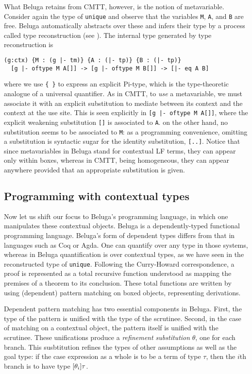 What Beluga retains from CMTT, however, is the notion of metavariable.
Consider again the type of \lstinline!unique! and observe that the variables
\lstinline!M!, \lstinline!A!, and \lstinline!B! are free.
Beluga automatically abstracts over these and infers their type by a process
called type reconstruction (see \cite{abstraction}).
The internal type generated by type reconstruction is
\begin{lstlisting}[gobble=2]
  (g:ctx) {M : (g |- tm)} {A : (|- tp)} {B : (|- tp)}
  [g |- oftype M A[]] -> [g |- oftype M B[]] -> [|- eq A B]
\end{lstlisting}
where we use \lstinline!{ }! to express an explicit Pi-type,
which is the type-theoretic analogue of a universal quantifier.
As in CMTT, to \emph{use} a metavariable, we must associate it with an explicit
substitution to mediate between its context and the context at the use site.
This is seen explicitly in \lstinline![g |- oftype M A[]]!, where the explicit
weakening substitution \lstinline![]! is associated to \lstinline!A!.
on the other hand, no substitution seems to be associated to \lstinline!M!:
as a programming convenience, omitting a substitution is syntactic sugar for the
identity substitution, \lstinline![..]!.
Notice that since metavariables in Beluga stand for contextual LF terms, they
can appear only within boxes, whereas in CMTT, being homogeneous, they can
appear anywhere provided that an appropriate substitution is given.

\subsection{Programming with contextual types}

Now let us shift our focus to Beluga's programming language, in which one
manipulates these contextual objects.
Beluga is a dependently-typed functional programming language.
Beluga's form of dependent types differs from that in languages such as Coq or
Agda.
One can quantify over any type in those systems, whereas in Beluga
quantification is over contextual types, as we have seen in the reconstructed
type of \lstinline!unique!.
Following the Curry-Howard correspondence, a proof is represented as a total
recursive function understood as mapping the premises of a theorem to its
conclusion.
These total functions are written by using (dependent) pattern matching on boxed
objects, representing derivations.

Dependent pattern matching has two essential components in Beluga.
First, the type of the pattern is unified with the type of the scrutinee.
Second, in the case of matching on a contextual object, the pattern itself is
unified with the scrutinee.
These unifications produce a \emph{refinement substitution} $\theta$, one for
each branch.
This susbtitution refines the types of other assumptions as well as the goal
type: if the case expression as a whole is to be a term of type $\tau$, then
the $i$th branch is to have type $[\theta_i]\tau$.

